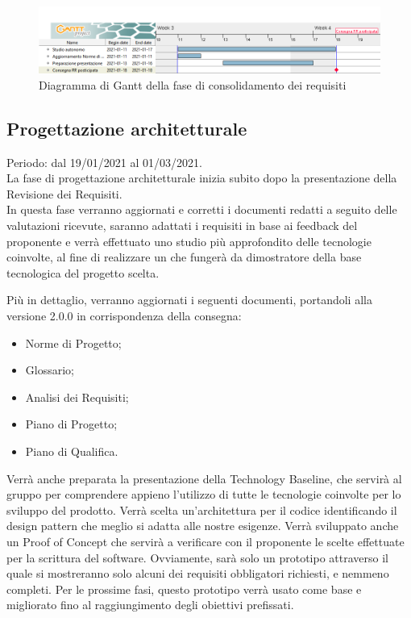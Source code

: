 \documentclass[../piano_di_progetto.tex]{subfiles}
\begin{document}
\begin{figure}[H]
\centering
\includegraphics[width=18cm]{src/img/gantt/01_RR_consolidamento.png}
\caption{ Diagramma di Gantt della fase di consolidamento dei requisiti}
\end{figure}

\subsection{Progettazione architetturale}%
\label{sub:prog_arc}
Periodo: dal 19/01/2021 al 01/03/2021.\\
La fase di progettazione architetturale inizia subito dopo la presentazione della Revisione dei Requisiti.\\
In questa fase verranno aggiornati e corretti i documenti redatti a seguito delle valutazioni ricevute, saranno adattati i requisiti in base ai feedback del proponente e verrà effettuato uno studio più approfondito delle tecnologie coinvolte, al fine di realizzare un  che fungerà da dimostratore della base tecnologica del progetto scelta. 

Più in dettaglio, verranno aggiornati i seguenti documenti, portandoli alla versione 2.0.0 in corrispondenza della consegna:

\begin{itemize}
    \item Norme di Progetto;
    \item Glossario;
    \item Analisi dei Requisiti;
    \item Piano di Progetto;
    \item Piano di Qualifica.
\end{itemize}

Verrà anche preparata la presentazione della Technology Baseline, che servirà al gruppo per comprendere appieno l'utilizzo di tutte le tecnologie coinvolte per lo sviluppo del prodotto. Verrà scelta un'architettura per il codice identificando il design pattern che meglio si adatta alle nostre esigenze. Verrà sviluppato anche un Proof of Concept che servirà a verificare con il proponente le scelte effettuate per la scrittura del software. Ovviamente, sarà solo un prototipo attraverso il quale si mostreranno solo alcuni dei requisiti obbligatori richiesti, e nemmeno completi. Per le prossime fasi, questo prototipo verrà usato come base e migliorato fino al raggiungimento degli obiettivi prefissati.
\end{document}
